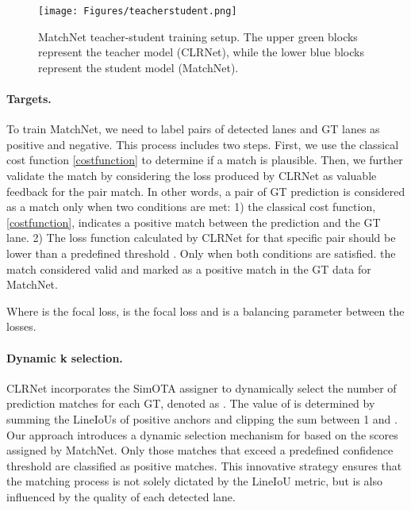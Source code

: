 \documentclass[10pt,twocolumn,letterpaper]{article}
\begin{document}
\begin{figure}[h]
\begin{center}
    \centering
    \texttt{[image: Figures/teacherstudent.png]}
\caption{MatchNet teacher-student training setup. The upper green blocks represent the teacher model (CLRNet), while the lower blue blocks represent the student model (MatchNet).}
\label{techearstudent}
\end{center}
\end{figure}
\vspace{-10pt}

\paragraph{\textbf{Targets.}}To train MatchNet, we need to label pairs of detected lanes and GT lanes as positive and negative. This process includes two steps. First, we use the classical cost function \ref{costfunction} to determine if a match is plausible. Then, we further validate the match by considering the loss produced by CLRNet as valuable feedback for the pair match. In other words, a pair of GT prediction is considered as a match only when two conditions are met: 1) the classical cost function,  \ref{costfunction}, indicates a positive match between the prediction  and the GT  lane. 2) The loss function calculated by CLRNet  for that specific pair should be lower than a predefined threshold . Only when both conditions are satisfied. the match considered valid and marked as a positive match in the GT data for MatchNet.

Where  is the focal loss,  is the focal loss and  is a balancing parameter between the losses.

\paragraph{Dynamic k selection.} CLRNet incorporates the SimOTA \cite{YOLOX} assigner to dynamically select the number of prediction matches for each GT, denoted as . The value of  is determined by summing the LineIoUs of positive anchors and clipping the sum between 1 and . Our approach introduces a dynamic selection mechanism for  based on the scores assigned by MatchNet. Only those matches that exceed a predefined confidence threshold are classified as positive matches. 
This innovative strategy ensures that the matching process is not solely dictated by the LineIoU metric, but is also influenced by the quality of each detected lane.
\end{document}
